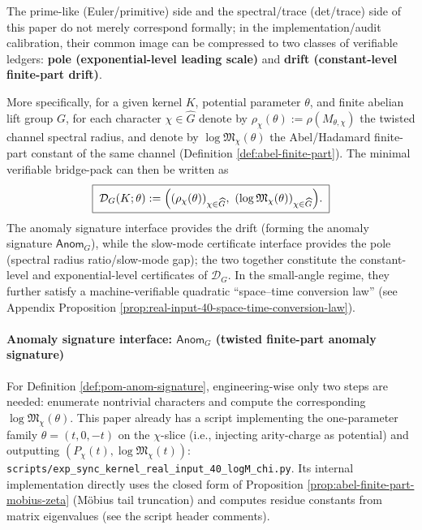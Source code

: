 \begin{remark}\label{rem:pom-pole-drift-bridgepack}
The prime-like (Euler/primitive) side and the spectral/trace (det/trace) side of this paper do not merely correspond formally; in the implementation/audit calibration, their common image can be compressed to two classes of verifiable ledgers:
\textbf{pole (exponential-level leading scale)} and \textbf{drift (constant-level finite-part drift)}.
\par
More specifically, for a given kernel \(K\), potential parameter \(\theta\), and finite abelian lift group \(G\), for each character \(\chi\in\widehat G\) denote by \(\rho_\chi(\theta):=\rho(M_{\theta,\chi})\) the twisted channel spectral radius, and denote by \(\log\mathfrak{M}_\chi(\theta)\) the Abel/Hadamard finite-part constant of the same channel (Definition \ref{def:abel-finite-part}). The minimal verifiable bridge-pack can then be written as
\[
\boxed{\;
\mathcal{D}_G(K;\theta):=\Bigl((\rho_\chi(\theta))_{\chi\in\widehat G},\ (\log\mathfrak{M}_\chi(\theta))_{\chi\in\widehat G}\Bigr).\;}
\]
The anomaly signature interface provides the drift (forming the anomaly signature \(\mathsf{Anom}_G\)), while the slow-mode certificate interface provides the pole (spectral radius ratio/slow-mode gap); the two together constitute the constant-level and exponential-level certificates of \(\mathcal{D}_G\).
In the small-angle regime, they further satisfy a machine-verifiable quadratic ``space--time conversion law'' (see Appendix Proposition \ref{prop:real-input-40-space-time-conversion-law}).
\end{remark}

\paragraph{Anomaly signature interface: \texorpdfstring{$\mathsf{Anom}_G$}{Anom} (twisted finite-part anomaly signature)}
For Definition \ref{def:pom-anom-signature}, engineering-wise only two steps are needed: enumerate nontrivial characters and compute the corresponding \(\log\mathfrak{M}_\chi(\theta)\).
This paper already has a script implementing the one-parameter family \(\theta=(t,0,-t)\) on the \(\chi\)-slice (i.e., injecting arity-charge as potential) and outputting \((P_\chi(t),\log\mathfrak{M}_\chi(t))\):
\texttt{scripts/exp\_sync\_kernel\_real\_input\_40\_logM\_chi.py}.
Its internal implementation directly uses the closed form of Proposition \ref{prop:abel-finite-part-mobius-zeta} (M\"obius tail truncation) and computes residue constants from matrix eigenvalues (see the script header comments).


